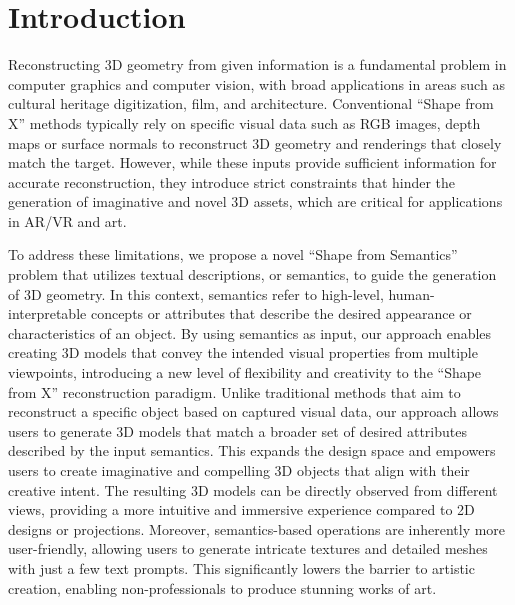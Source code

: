 \section{Introduction}
Reconstructing 3D geometry from given information is a fundamental problem in computer graphics and computer vision, with broad applications in areas such as cultural heritage digitization, film, and architecture. Conventional ``Shape from X'' methods typically rely on specific visual data such as RGB images, depth maps or surface normals to reconstruct 3D geometry and renderings that closely match the target. However, while these inputs provide sufficient information for accurate reconstruction, they introduce strict constraints that hinder the generation of imaginative and novel 3D assets, which are critical for applications in AR/VR and art.

To address these limitations, we propose a novel ``Shape from Semantics'' problem that utilizes textual descriptions, or semantics, to guide the generation of 3D geometry. In this context, semantics refer to high-level, human-interpretable concepts or attributes that describe the desired appearance or characteristics of an object. By using semantics as input, our approach enables creating 3D models that convey the intended visual properties from multiple viewpoints, introducing a new level of flexibility and creativity to the ``Shape from X'' reconstruction paradigm. Unlike traditional methods that aim to reconstruct a specific object based on captured visual data, our approach allows users to generate 3D models that match a broader set of desired attributes described by the input semantics. This expands the design space and empowers users to create imaginative and compelling 3D objects that align with their creative intent. The resulting 3D models can be directly observed from different views, providing a more intuitive and immersive experience compared to 2D designs or projections. Moreover, semantics-based operations are inherently more user-friendly, allowing users to generate intricate textures and detailed meshes with just a few text prompts. This significantly lowers the barrier to artistic creation, enabling non-professionals to produce stunning works of art. 


